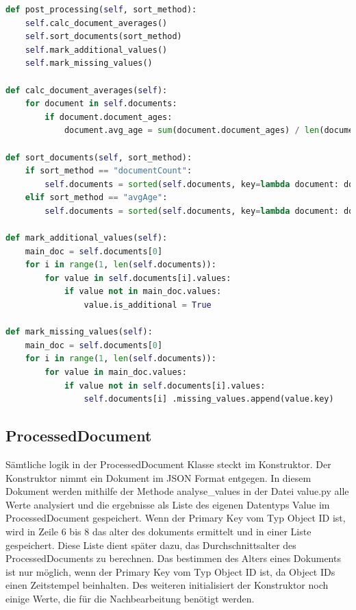 \begin{lstlisting}[language=python, caption={ProcessedCollection.post\_processing},label={lst:backend_post_processing}]
def post_processing(self, sort_method):
    self.calc_document_averages()
    self.sort_documents(sort_method)
    self.mark_additional_values()
    self.mark_missing_values()

def calc_document_averages(self):
    for document in self.documents:
        if document.document_ages:
            document.avg_age = sum(document.document_ages) / len(document.document_ages)

def sort_documents(self, sort_method):
    if sort_method == "documentCount":
        self.documents = sorted(self.documents, key=lambda document: document.count, reverse=True)
    elif sort_method == "avgAge":
        self.documents = sorted(self.documents, key=lambda document: document.avg_age, reverse=True)

def mark_additional_values(self):
    main_doc = self.documents[0]
    for i in range(1, len(self.documents)):
        for value in self.documents[i].values:
            if value not in main_doc.values:
                value.is_additional = True

def mark_missing_values(self):
    main_doc = self.documents[0]
    for i in range(1, len(self.documents)):
        for value in main_doc.values:
            if value not in self.documents[i].values:
                self.documents[i] .missing_values.append(value.key)
\end{lstlisting}

\subsection{ProcessedDocument}
\label{sub:ba_processed_document}

Sämtliche logik in der ProcessedDocument Klasse steckt im Konstruktor.
Der Konstruktor nimmt ein Dokument im JSON Format entgegen.
In diesem Dokument werden mithilfe der Methode analyse\_values in der Datei value.py alle Werte analysiert und die ergebnisse als Liste des eigenen Datentyps Value im ProcessedDocument gespeichert.
Wenn der Primary Key vom Typ Object ID ist, wird in Zeile 6 bis 8 das alter des dokuments ermittelt und in einer Liste gespeichert.
Diese Liste dient später dazu, das Durchschnittsalter des ProcessedDocuments zu berechnen.
Das bestimmen des Alters eines Dokuments ist nur möglich, wenn der Primary Key vom Typ Object ID ist, da Object IDs einen Zeitstempel beinhalten.
Des weiteren initialisiert der Konstruktor noch einige Werte, die für die Nachbearbeitung benötigt werden.


